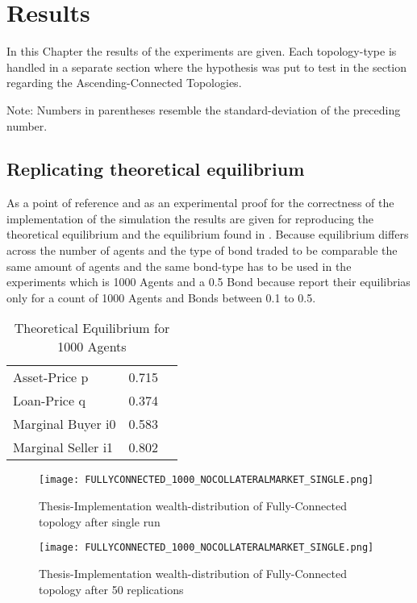 \documentclass[Bachelorarbeit.tex]{subfiles}
\begin{document}
\graphicspath{{./figures/results/}}	%

\chapter{Results}

In this Chapter the results of the experiments are given. Each topology-type is handled in a separate section where the hypothesis was put to test in the section regarding the Ascending-Connected Topologies.

Note: Numbers in parentheses resemble the standard-deviation of the preceding number.

\section{Replicating theoretical equilibrium}
As  a point of reference and as an experimental proof for the correctness of the implementation of the simulation the results are given for reproducing the theoretical equilibrium and the equilibrium found in \cite{Breuer2015}.
Because equilibrium differs across the number of agents and the type of bond traded to be comparable the same amount of agents and the same bond-type has to be used in the experiments which is 1000 Agents and a 0.5 Bond because \cite{Breuer2015} report their equilibrias only for a count of 1000 Agents and Bonds between 0.1 to 0.5.

\begin{table}[h]
	\centering
	\caption{Theoretical Equilibrium for 1000 Agents}
	\begin{tabular} { l c r }
		\hline
		Asset-Price p & 0.715 \\
		Loan-Price q & 0.374 \\
		Marginal Buyer i0 & 0.583 \\
		Marginal Seller i1 & 0.802 \\
		\hline
	\end{tabular}
\end{table}


\begin{figure}[!htbp]
	\centering
  \texttt{[image: FULLYCONNECTED\_1000\_NOCOLLATERALMARKET\_SINGLE.png]}
	\caption{Thesis-Implementation wealth-distribution of Fully-Connected topology after single run}
	\label{fig1}
\end{figure}

\begin{figure}[!htbp]
	\centering
  \texttt{[image: FULLYCONNECTED\_1000\_NOCOLLATERALMARKET\_SINGLE.png]}
	\caption{Thesis-Implementation wealth-distribution of Fully-Connected topology after 50 replications}
	\label{fig1}
\end{figure}
\end{document}
